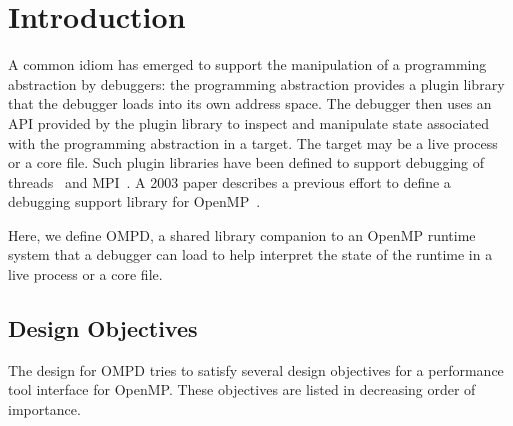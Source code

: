 \documentclass{article}
\begin{document}
\begin{comment}
For OpenMP, we are separately developing a standard for OMPD---a shared library that will serve as a debugger plugin. 


\section{OMPD: A Debugger Support Library}
\label{appendix:ompd}
\end{comment}

\section{Introduction}

A common idiom has emerged to support the manipulation of a programming abstraction by debuggers: the programming abstraction provides a plugin library that the debugger  loads into its own address space. The debugger then uses an API provided by the plugin library to inspect and manipulate state associated with the programming abstraction in a target. The target may be a live process or a core file. Such plugin libraries have been defined to support debugging of threads~\cite{libthreaddb} and MPI~\cite{CownieGropp99}. A 2003 paper describes a previous effort to define a debugging support library for OpenMP~\cite{Cownie:2003:DOD:1761900.1761915}.

Here, we define OMPD, a shared library companion to an OpenMP runtime system 
that a debugger can load to help interpret the state of the runtime in a live process or a core file.  


\subsection{Design Objectives}

The design for OMPD tries to satisfy several design objectives for a performance tool interface for OpenMP. These objectives are listed in decreasing order of importance.
\end{document}
